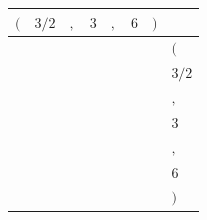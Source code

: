 {\scriptsize\setlength{\tabcolsep}{1.5pt}%
\begin{tabular}{ccccccc|l}
$($ & $\text{3/2}$ & $,$ & $\text{3}$ & $,$ & $\text{6}$ & $)$ & \\ \hline
\gcell{$$} & \gcell{$$} & \gcell{$$} & \gcell{$$} & \gcell{$$} & \gcell{$$} & \gcell{$$} & $($ \\
\gcell{$$} & \gcell{$\posD{\bullet}$} & \gcell{$$} & \gcell{$\posD{\bullet}$} & \gcell{$$} & \gcell{$\posC{\circ}$} & \gcell{$$} & $\text{3/2}$ \\
\gcell{$$} & \gcell{$$} & \gcell{$$} & \gcell{$$} & \gcell{$$} & \gcell{$$} & \gcell{$$} & $,$ \\
\gcell{$$} & \gcell{$\posD{\bullet}$} & \gcell{$$} & \gcell{$\posD{\bullet}$} & \gcell{$$} & \gcell{$\posD{\bullet}$} & \gcell{$$} & $\text{3}$ \\
\gcell{$$} & \gcell{$$} & \gcell{$$} & \gcell{$$} & \gcell{$$} & \gcell{$$} & \gcell{$$} & $,$ \\
\gcell{$$} & \gcell{$\posC{\circ}$} & \gcell{$$} & \gcell{$\posD{\bullet}$} & \gcell{$$} & \gcell{$\posD{\bullet}$} & \gcell{$$} & $\text{6}$ \\
\gcell{$$} & \gcell{$$} & \gcell{$$} & \gcell{$$} & \gcell{$$} & \gcell{$$} & \gcell{$$} & $)$ \\
\end{tabular}}
